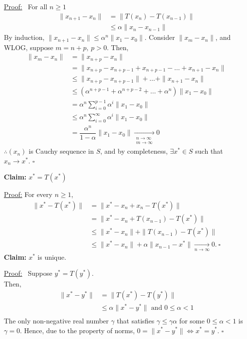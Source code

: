 \documentclass[letterpaper]{article}
\begin{document}
\underline{Proof:}~ For all $n\geq 1$
    \begin{align*}
        \| x_{n+1}-x_n \| &= \| T\left(x_n\right)-T\left(x_{n-1}\right) \|\\
        &\leq \alpha\| x_n-x_{n-1}\|
    \end{align*}
    By induction, $\| x_{n+1}-x_n \| \leq \alpha^n\| x_1-x_0 \|$. Consider $\| x_m-x_n \|$, and WLOG, suppose $m=n+p,\ p > 0$. Then,
    \begin{align*}
        \| x_m-x_n \| &= \| x_{n+p}-x_n \|\\
        &= \| x_{n+p}-x_{n+p-1}+x_{n+p-1}- \dots +x_{n+1}-x_n\|\\
        &\leq \| x_{n+p}-x_{n+p-1}\|+ \dots + \| x_{n+1}-x_n\|\\
        &\leq \left(\alpha^{n+p-1}+\alpha^{n+p-2}+ \dots + \alpha^n\right)\|x_1-x_0\|\\
        &= \alpha^n \sum\limits_{i=0}^{p-1} \alpha^i\|x_1-x_0\|\\
        &\leq \alpha^n \sum\limits_{i=0}^\infty \alpha^i\|x_1-x_0\|\\
        &= \dfrac{\alpha^n}{1-\alpha}\|x_1-x_0\| \xrightarrow[\substack{n\rightarrow \infty \\ m\rightarrow \infty}]{}0
    \end{align*}
    $\therefore \left(x_n\right)$ is Cauchy sequence in $S$, and by completeness, $\exists x^* \in S$ such that $x_n \rightarrow x^*$. $\square$

\noindent \textbf{Claim:} $x^*=T\left(x^*\right)$

\underline{Proof:} For every $n\ge 1$,
    \begin{align*}
        \| x^*-T\left(x^*\right) \| &= \| x^*-x_n+x_n- T\left(x^*\right)\| \\
        &=\| x^*-x_n+T\left(x_{n-1}\right)- T\left(x^*\right)\| \\
        &\leq \| x^*-x_n\|+\|T\left(x_{n-1}\right)- T\left(x^*\right)\| \\
        &\leq \| x^*-x_n\|+\alpha \|x_{n-1}-x^*\| \xrightarrow[n\rightarrow \infty]{}0.\ \square
    \end{align*}
\noindent \textbf{Claim:} $x^*$ is unique.

\underline{Proof:}~ Suppose $y^*=T\left(y^*\right)$.\\
    Then,
    \vspace{-5mm}
    \begin{align*}
        \|x^*-y^*\|&=\|T\left(x^*\right)- T\left(y^*\right)\| \\
        &\leq \alpha \|x^*-y^*\| \text{ and } 0 \leq \alpha < 1\\
    \end{align*}
    The only non-negative real number $\gamma$ that satisfies $\gamma \le \gamma \alpha$ for some $0 \le \alpha < 1$ is $\gamma=0$.
   Hence, due to the property of norms, $0=\|x^*-y^*\|\Leftrightarrow x^*=y^*$. $\square$
\end{document}

